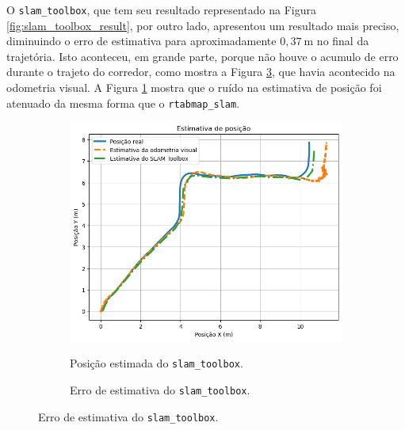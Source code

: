 \documentclass[repeatfields,xlists,xpacks,oneside,yearsonly]{ufrgscca}
\begin{document}
O \texttt{slam\_toolbox}, que tem seu resultado representado na
Figura \ref{fig:slam_toolbox_result}, por outro lado, apresentou um
resultado mais preciso, diminuindo o erro de estimativa para
aproximadamente $0,37~\si{\meter}$ no final da trajetória. Isto
aconteceu, em grande parte, porque não houve o acumulo de erro
durante o trajeto do corredor, como mostra a Figura
\ref{fig:localization_slam_toolbox_error}, que havia acontecido na
odometria visual. A Figura \ref{fig:localization_slam_toolbox} mostra
que o ruído na estimativa de posição foi atenuado da mesma forma que
o \texttt{rtabmap\_slam}.

\begin{figure}[H]
    \caption{Resultado do pacote \texttt{slam\_toolbox}.}
    \label{fig:slam_toolbox_result}
    \begin{subfigure}{0.5\linewidth}
        {
            \centering
            \caption{Posição estimada do \texttt{slam\_toolbox}.}
            \label{fig:localization_slam_toolbox}
            \includegraphics[width=0.98\linewidth]{localization-slam-toolbox-new.png}\\
        }
    \end{subfigure}
    \begin{subfigure}{0.5\linewidth}
        {
            \centering
            \caption{Erro de estimativa do \texttt{slam\_toolbox}.}
            \label{fig:localization_slam_toolbox_error}
}
\end{subfigure}
\end{figure}
\end{document}
